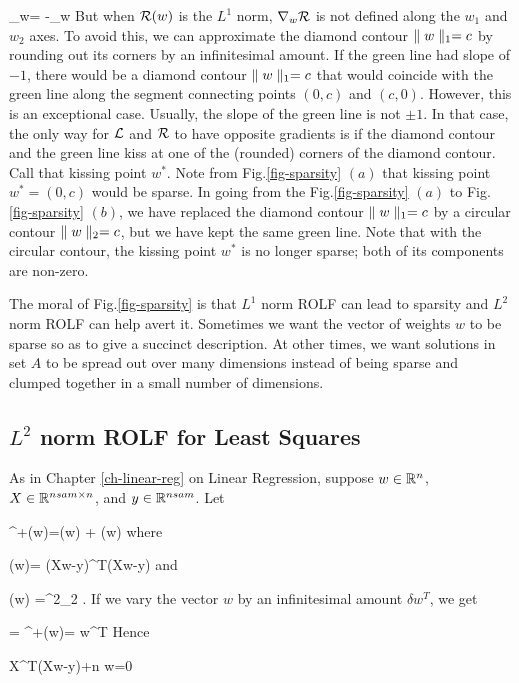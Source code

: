 \beq
\nabla_w\call = -\nabla_w \calr
\eeq
But when ${\cal R}(w)$ is
the $L^1$ norm,  $\nabla_w{\cal R}$ is not defined along the $w_1$
and $w_2$ axes. To avoid this, we can
approximate the diamond contour $\parallel w\parallel_1=c$
by rounding out its corners
by an infinitesimal amount. If the green line had
slope of $-1$,
there would be a diamond contour
 $\parallel w\parallel_1=c$ that would coincide with the green line along the
 segment connecting points $(0,c)$
 and $(c,0)$. However, this is an exceptional case. Usually, the slope
 of the green line is not $\pm 1$.
 In that case, the only way for
 ${\cal L}$ and ${\cal R}$ to have
 opposite gradients is if the diamond
 contour and the green line
 kiss at one of the (rounded)  corners
 of the diamond contour. Call that
 kissing point $w^*$. Note from
 Fig.\ref{fig-sparsity} $(a)$ that kissing point $w^*=(0,c)$ would be
 sparse. In going from the Fig.\ref{fig-sparsity} $(a)$ to Fig.\ref{fig-sparsity} $(b)$,
 we have replaced the diamond contour
 $\parallel w\parallel_1=c$ by
 a circular contour $\parallel w\parallel_2=c$,
 but we have kept the same green line.
 Note that with the circular contour,
 the kissing point $w^*$ is no longer sparse; both of its components are non-zero.

 The moral of Fig.\ref{fig-sparsity}
 is that $L^1$ norm ROLF can lead to sparsity and $L^2$ norm ROLF can help avert it.
 Sometimes we want the vector of weights $w$ to be sparse so as to give
 a succinct description.
 At other times, we want solutions in set $A$ to be spread out over many dimensions instead of being sparse and clumped together in a small number of dimensions.






\subsection{$L^2$ norm ROLF for Least Squares}
As in Chapter \ref{ch-linear-reg} on Linear Regression,
suppose $w\in{ \mathbb{R}}^n$, $X\in { \mathbb{R}}^{nsam\times n}$,
 and  $y\in{ \mathbb{R}}^{nsam} $. Let

\beq
\call^+(w)=\call(w) + \calr(w)
\eeq
where

\beq
\call(w)=
(Xw-y)^T(Xw-y)
\eeq
and

\beq
\calr(w) =\lam{}^2_2
\;.
\eeq
If we vary the  vector $w$ by an
infinitesimal amount $\delta w^T$, we get

= \delta\call^+(w)=
\delta w^T
\eeq
Hence

\beq
X^T(Xw-y)+\lam n  w=0
\eeq

